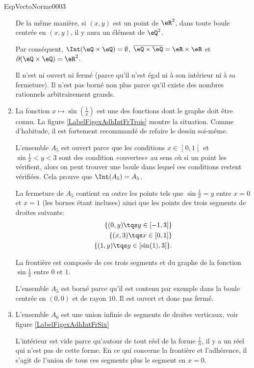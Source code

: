 \begin{corrige}{EspVectoNorme0003}
\begin{enumerate}
			De la même manière, si $(x,y)$ est un point de $\eR^2$, dans toute boule centrée en $(x,y)$, il y aura un élément de $\eQ^2$.

			Par conséquent, $\Int(\eQ\times\eQ)=\emptyset$, $\overline{ \eQ\times\eQ }=\eR\times\eR$ et $\partial(\eQ\times\eQ)=\eR^2$.

			Il n'est ni ouvert ni fermé (parce qu'il n'est égal ni à son intérieur ni à sa fermeture). Il n'est pas borné non plus parce qu'il existe des nombres rationnels arbitrairement grands.

		\item
			La fonction $x\mapsto\sin(\frac{1}{ x })$ est une des fonctions dont le graphe doit être connu. La figure \ref{LabelFigexAdhIntFrTrois} montre la situation. Comme d'habitude, il est fortement recommandé de refaire le dessin soi-même.
\newcommand{\CaptionFigexAdhIntFrTrois}{Les points qui dont sur l'axe vertical entre $0$ et $3$ sont sur la frontière, mais pas dans l'ensemble $A_5$.}


			L'ensemble $A_5$ est ouvert parce que les conditions $x\in\mathopen] 0 , 1 \mathclose[$ et $\sin\frac{1}{ x }<y<3$ sont des condition «ouvertes» au sens où si un point les vérifient, alors on peut trouver une boule dans lequel ces conditions restent vérifiées. Cela prouve que $\Int(A_5)=A_5$.

			La fermeture de $A_5$ contient en outre les points tels que $\sin\frac{1}{ x }=y$ entre $x=0$ et $x=1$ (les bornes étant incluses) ainsi que les points des trois segments de droites suivants:
			\begin{equation}
				\begin{aligned}[]
					\{ (0,y)\tqs y\in\mathopen[ -1 , 3 \mathclose] \}\\
					\{ (x,3)\tqs x\in\mathopen[ 0 , 1 \mathclose] \}\\
					\{ (1,y)\tqs y\in\mathopen[ \sin(1) , 3 \mathclose] \}.
				\end{aligned}
			\end{equation}

			La frontière est composée de ces trois segments et du graphe de la fonction $\sin\frac{1}{ x }$ entre $0$ et $1$.

			L'ensemble $A_5$ est borné parce qu'il est contenu par exemple dans la boule centrée en $(0,0)$ et de rayon $10$. Il est ouvert et donc pas fermé.

		\item
			L'ensemble $A_6$ est une union infinie de segments de droites verticaux, voir figure \ref{LabelFigexAdhIntFrSix}
\newcommand{\CaptionFigexAdhIntFrSix}{Le segment sur l'axe vertical entre $y=0$ et $y=1$ fait partie de l'adhérence et de la frontière, mais pas de l'ensemble $A_6$ lui-même.}

				L'intérieur est vide parce qu'autour de tout réel de la forme $\frac{1}{ n }$, il y a un réel qui n'est pas de cette forme. En ce qui concerne la frontière et l'adhérence, il s'agit de l'union de tous ces segments plus le segment en $x=0$.


\end{enumerate}
\end{corrige}
